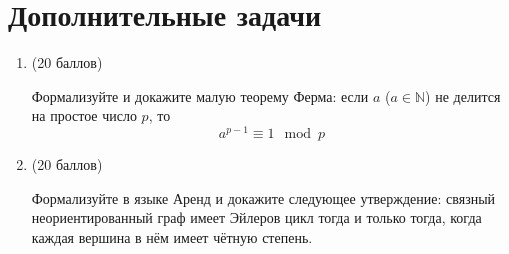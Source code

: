\documentclass[10pt,a4paper,oneside]{article}
\begin{document}
\section*{Дополнительные задачи}

\begin{enumerate}
\item (20 баллов) 

Формализуйте и докажите малую теорему Ферма: если $a$ ($a \in \mathbb{N}$) не делится на простое число $p$,
то $$a^{p-1} \equiv 1 \mod p$$ 


\item (20 баллов) 

Формализуйте в языке Аренд и докажите следующее утверждение: связный неориентированный
граф имеет Эйлеров цикл тогда и только тогда, когда каждая вершина в нём имеет чётную степень.
\end{enumerate}
\end{document}
